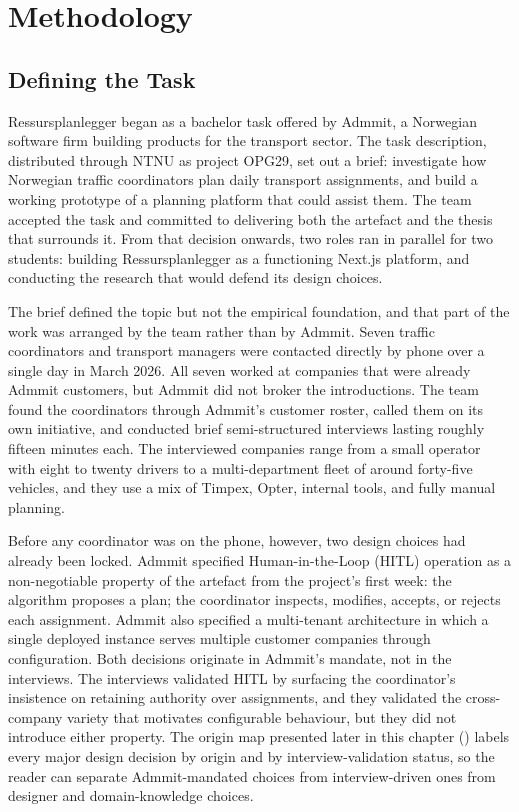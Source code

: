 \chapter{Methodology}
\label{chap:method}



\section{Defining the Task}
\label{sec:defining-task}

Ressursplanlegger began as a bachelor task offered by Admmit, a Norwegian software firm building products for the transport sector. The task description, distributed through NTNU as project OPG29, set out a brief: investigate how Norwegian traffic coordinators plan daily transport assignments, and build a working prototype of a planning platform that could assist them. The team accepted the task and committed to delivering both the artefact and the thesis that surrounds it. From that decision onwards, two roles ran in parallel for two students: building Ressursplanlegger as a functioning Next.js platform, and conducting the research that would defend its design choices.

The brief defined the topic but not the empirical foundation, and that part of the work was arranged by the team rather than by Admmit. Seven traffic coordinators and transport managers were contacted directly by phone over a single day in March 2026. All seven worked at companies that were already Admmit customers, but Admmit did not broker the introductions. The team found the coordinators through Admmit's customer roster, called them on its own initiative, and conducted brief semi-structured interviews lasting roughly fifteen minutes each. The interviewed companies range from a small operator with eight to twenty drivers to a multi-department fleet of around forty-five vehicles, and they use a mix of Timpex, Opter, internal tools, and fully manual planning.

Before any coordinator was on the phone, however, two design choices had already been locked. Admmit specified Human-in-the-Loop (HITL) operation as a non-negotiable property of the artefact from the project's first week: the algorithm proposes a plan; the coordinator inspects, modifies, accepts, or rejects each assignment. Admmit also specified a multi-tenant architecture in which a single deployed instance serves multiple customer companies through configuration. Both decisions originate in Admmit's mandate, not in the interviews. The interviews validated HITL by surfacing the coordinator's insistence on retaining authority over assignments, and they validated the cross-company variety that motivates configurable behaviour, but they did not introduce either property. The origin map presented later in this chapter () labels every major design decision by origin and by interview-validation status, so the reader can separate Admmit-mandated choices from interview-driven ones from designer and domain-knowledge choices.

